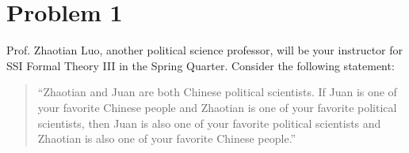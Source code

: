 \documentclass[11pt]{article}
\begin{document}
	
	
	\psetheader
\section*{Problem 1}
\begin{problem}
Prof. Zhaotian Luo, another political science professor, will be your instructor for
SSI Formal Theory III in the Spring Quarter. Consider the following statement:
\begin{quote}
“Zhaotian and Juan are both Chinese political scientists. If Juan is one of your
favorite Chinese people and Zhaotian is one of your favorite political scientists,
then Juan is also one of your favorite political scientists and Zhaotian is also one
of your favorite Chinese people.”
\end{quote}
\end{problem}
\end{document}
